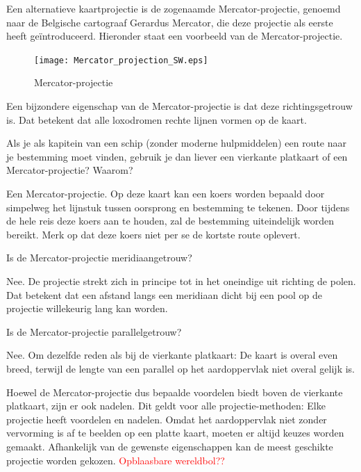 Een alternatieve kaartprojectie is de zogenaamde Mercator-projectie, genoemd naar de Belgische cartograaf Gerardus Mercator, die deze projectie als eerste heeft ge\"introduceerd. Hieronder staat een voorbeeld van de Mercator-projectie.

\begin{figure}[h]
	\centering
	\texttt{[image: Mercator\_projection\_SW.eps]}
	\caption{Mercator-projectie}
	\label{fig_mercator}
\end{figure}
Een bijzondere eigenschap van de Mercator-projectie is dat deze richtingsgetrouw is. Dat betekent dat alle loxodromen rechte lijnen vormen op de kaart.

\begin{opgave}
	Als je als kapitein van een schip (zonder moderne hulpmiddelen) een route naar je bestemming moet vinden, gebruik je dan liever een vierkante platkaart of een Mercator-projectie? Waarom?
	\begin{antwoord}
		Een Mercator-projectie. Op deze kaart kan een koers worden bepaald door simpelweg het lijnstuk tussen oorsprong en bestemming te tekenen. Door tijdens de hele reis deze koers aan te houden, zal de bestemming uiteindelijk worden bereikt. Merk op dat deze koers niet per se de kortste route oplevert.
	\end{antwoord}
\end{opgave}

\begin{opgave}
	\begin{subopgave}
		Is de Mercator-projectie meridiaangetrouw?
		\begin{antwoord}
			Nee. De projectie strekt zich in principe tot in het oneindige uit richting de polen. Dat betekent dat een afstand langs een meridiaan dicht bij een pool op de projectie willekeurig lang kan worden.
		\end{antwoord}
	\end{subopgave}
	\begin{subopgave}
		Is de Mercator-projectie parallelgetrouw?
		\begin{antwoord}
			Nee. Om dezelfde reden als bij de vierkante platkaart: De kaart is overal even breed, terwijl de lengte van een parallel op het aardoppervlak niet overal gelijk is.
		\end{antwoord}
	\end{subopgave}
\end{opgave}

Hoewel de Mercator-projectie dus bepaalde voordelen biedt boven de vierkante platkaart, zijn er ook nadelen. Dit geldt voor alle projectie-methoden: Elke projectie heeft voordelen en nadelen. Omdat het aardoppervlak niet zonder vervorming is af te beelden op een platte kaart, moeten er altijd keuzes worden gemaakt. Afhankelijk van de gewenste eigenschappen kan de meest geschikte projectie worden gekozen. \textcolor{red}{Opblaasbare wereldbol??}

